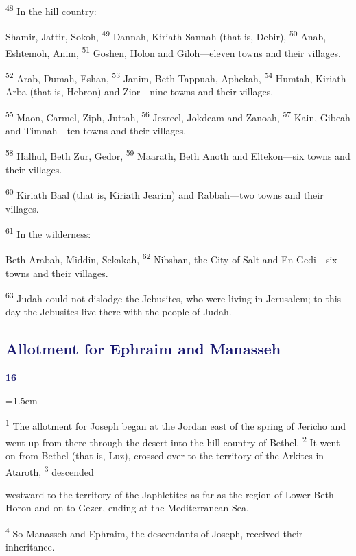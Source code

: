 \documentclass[12pt,twoside]{article}
\newcommand{\vs}[1]{\textsuperscript{#1}}
\newcommand{\chapterWithBigIndent}[2]{%
  \noindent
  \begin{minipage}[t]{1cm}
    \vspace{-0.4\baselineskip}
    {\textcolor{MidnightBlue}{\fontsize{40pt}{48pt}\selectfont \textbf{#1}}}
  \end{minipage}%
  \hspace{0.9cm}%
  \begin{minipage}[t]{\dimexpr\linewidth - 1.5cm - 0.3cm\relax}
    \hangindent=1.5em
    \hangafter=3
    #2
    \vspace{0.05cm}
  \end{minipage}
}
\begin{document}
\noindent\vs{48} In the hill country:\vspace{0.3cm}

\begin{adjustwidth}{0.5cm}{0cm}
  \hspace{0.5cm}Shamir, Jattir, Sokoh,
  \vs{49} Dannah, Kiriath Sannah (that is, Debir),
  \vs{50} Anab, Eshtemoh, Anim,
  \vs{51} Goshen, Holon and Giloh---eleven towns and their villages.

  \vs{52} Arab, Dumah, Eshan,
  \vs{53} Janim, Beth Tappuah, Aphekah,
  \vs{54} Humtah, Kiriath Arba (that is, Hebron) and Zior---nine towns and their villages.

  \vs{55} Maon, Carmel, Ziph, Juttah,
  \vs{56} Jezreel, Jokdeam and Zanoah,
  \vs{57} Kain, Gibeah and Timnah---ten towns and their villages.

  \vs{58} Halhul, Beth Zur, Gedor,
  \vs{59} Maarath, Beth Anoth and Eltekon---six towns and their villages.

  \vs{60} Kiriath Baal (that is, Kiriath Jearim) and Rabbah---two towns and their villages.\vspace{0.3cm}
\end{adjustwidth}

\noindent\vs{61} In the wilderness:\vspace{0.3cm}

\begin{adjustwidth}{0.5cm}{0cm}
  \hspace{0.5cm}Beth Arabah, Middin, Sekakah,
  \vs{62} Nibshan, the City of Salt and En Gedi---six towns and their villages.\vspace{0.3cm}
\end{adjustwidth}

\noindent\vs{63} Judah could not dislodge the Jebusites, who were living in Jerusalem; to this day the Jebusites live there with the people of Judah.

\subsection*{\textcolor{MidnightBlue}{\textbf{Allotment for Ephraim and Manasseh}}}

\chapterWithBigIndent{16}{
  \vs{1} The allotment for Joseph began at the Jordan east of the spring of Jericho and went up from there through the desert into the hill country of Bethel.
  \vs{2} It went on from Bethel (that is, Luz), crossed over to the territory of the Arkites in Ataroth,
  \vs{3} descended
}
\begin{adjustwidth}{0.5cm}{0cm}
  westward to the territory of the Japhletites as far as the region of Lower Beth Horon and on to Gezer, ending at the Mediterranean Sea.\vspace{0.3cm}
\end{adjustwidth}
\vspace{-0.3cm}\noindent \vs{4} So Manasseh and Ephraim, the descendants of Joseph, received their inheritance.\vspace{0.3cm}
\end{document}
